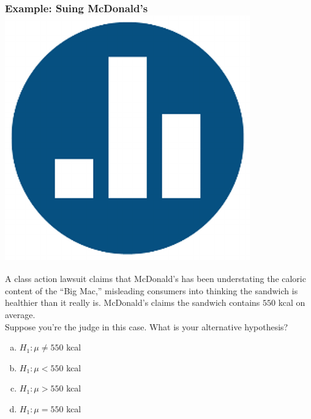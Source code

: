 \documentclass[handout]{beamer}
\begin{document}
\begin{frame}
\frametitle{Example: Suing McDonald's \hfill \includegraphics[scale = 0.05]{./images/clicker}}

A class action lawsuit claims that McDonald's has been  understating the caloric content of the ``Big Mac,'' misleading consumers into thinking the sandwich is healthier than it really is. McDonald's claims the sandwich contains $550$ kcal on average. \\

\vspace{1em}
\alert{Suppose you're the judge in this case. What is your alternative hypothesis?}

	\begin{enumerate}[(a)]
		\item $H_1\colon \mu \neq 550$ kcal
		\item $H_1\colon \mu < 550$ kcal
		\item $H_1\colon \mu > 550$ kcal
		\item $H_1\colon \mu = 550$ kcal
\end{enumerate}
\end{frame}
\end{document}
